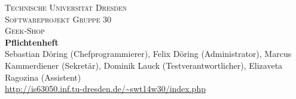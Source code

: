 \begin{titlepage}
\begin{center}
\textsc{\LARGE Technische Universit\"at Dresden} \\[0.5cm]
\textsc{\LARGE Softwareprojekt Gruppe 30}\\[0.5cm]
\textsc{\LARGE Geek-Shop}\\[3cm]
{\Huge \bfseries Pflichtenheft}\\
\vspace*{\fill}
Sebastian D\"oring (Chefprogrammierer), Felix D\"oring (Administrator), Marcus Kammerdiener (Sekret\"ar), Dominik Lauck (Testverantwortlicher), Elizaveta Ragozina (Assistent)\\[0.5cm]
\url{http://is63050.inf.tu-dresden.de/~swt14w30/index.php}
\end{center}
\end{titlepage}
